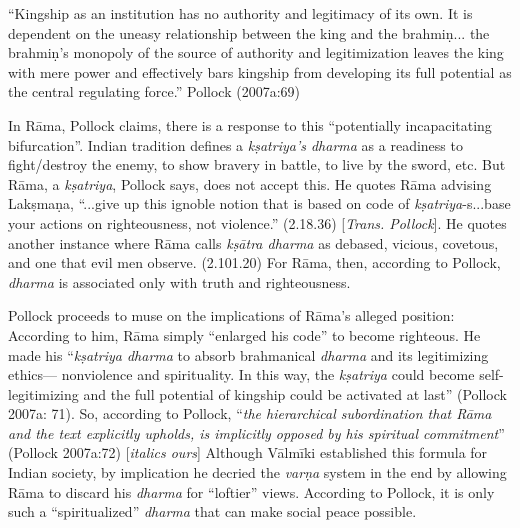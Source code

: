 \begin{myquote}
“Kingship as an institution has no authority and legitimacy of its own. It is dependent on the uneasy relationship between the king and the brahmiṇ... the brahmiṇ’s monopoly of the source of authority and legitimization leaves the king with mere power and effectively bars kingship from developing its full potential as the central regulating force.” 	
\hfill Pollock (2007a:69)
\end{myquote}

In Rāma, Pollock claims, there is a response to this “potentially incapacitating bifurcation”. Indian tradition defines a {\sl kṣatriya’s dharma} as a readiness to fight/destroy the enemy, to show bravery in battle, to live by the sword, etc. But Rāma, a {\sl kṣatriya}, Pollock says, does not accept this. He quotes Rāma advising Lakṣmaṇa, “...give up this ignoble notion that is based on code of {\sl kṣatriya}-s...base your actions on righteousness, not violence.” (2.18.36) [{\sl Trans. Pollock}]. He quotes another instance where Rāma calls {\sl kṣātra dharma} as debased, vicious, covetous, and one that evil men observe. (2.101.20) For Rāma, then, according to Pollock, {\sl dharma} is associated only with truth and righteousness.

Pollock proceeds to muse on the implications of Rāma’s alleged position: According to him, Rāma simply “enlarged his code” to become righteous. He made his “{\sl kṣatriya dharma} to absorb brahmanical {\sl dharma} and its legitimizing ethics--- nonviolence and spirituality. In this way, the {\sl kṣatriya} could become self-legitimizing and the full potential of kingship could be activated at last” (Pollock 2007a: 71). So, according to Pollock, “{\sl the hierarchical subordination that Rāma and the text explicitly upholds, is implicitly opposed by his spiritual commitment}” (Pollock 2007a:72) [{\sl italics ours}] Although Vālmīki established this formula for Indian society, by implication he decried the {\sl varṇa} system in the end by allowing Rāma to discard his {\sl dharma} for “loftier” views. According to Pollock, it is only such a “spiritualized” {\sl dharma} that can make social peace possible.

